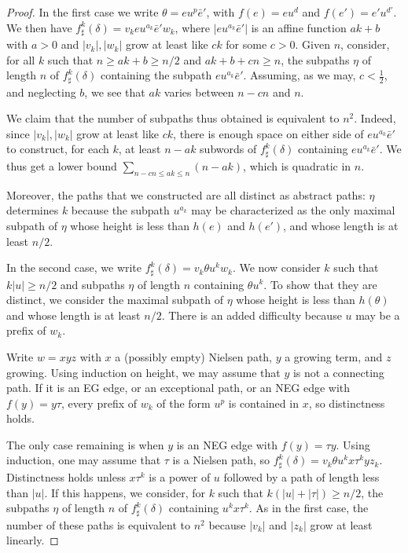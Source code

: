 \documentclass[11pt]{amsart}
\theoremstyle{remark}
\begin{document}
\begin{proof}
In the first case we write  $\theta=eu^p\bar e'$, with $f(e)=eu^d$ and $f(e')=e'u^{d'}$.
We then have  $f^k_\sharp(\delta)=v_keu^{a_k}\bar e'w_k$, where $ | eu^{a_k}\bar e' | $ is an affine function $ak+b$  with $a>0$ and   $ | v_k | , | w_k | $  grow at least like $ck$ for some $c>0$. Given $n$, consider, for all $k$ such that $n\ge ak+b\ge n/2$ and $ ak+b+cn \ge n$, 
the subpaths $\eta$ of length $n$ of $f^k_\sharp(\delta)$ containing the subpath $eu^{a_k}\bar e'$. Assuming, as we may, $c<\frac12$, and neglecting $b$, we see that $ak$ varies between $n-cn$ and $n$.

 We claim that the number of subpaths thus obtained is equivalent to $n^2$.    
 Indeed, since $ | v_k | , | w_k | $ grow at least like $ck$, there is enough space on either side of $eu^{a_k}\bar e'$  to construct, for each $k$, at least $n-ak$ subwords of $f^k_\sharp(\delta)$ containing $eu^{a_k}\bar e'$.  We thus get  a lower bound $\displaystyle\sum_{   {n-cn}\le ak\le{  n}}(n-ak) $, which is quadratic in $n$.




 Moreover,
%
the paths that we constructed are all distinct as abstract paths: $\eta$ determines $k$  because the subpath $u^{a_k}$ may be characterized as the only maximal subpath   of $\eta$ whose height   is less than $h(e)$ and $h(e')$, and whose length is at least $n/2$.   

 In the second case, we write $f^k_\sharp(\delta)=v_k\theta u^{ k} w_k$. We now consider $k$ such that $k | u | \ge n/2$ and subpaths $\eta$ of length $n$ containing $\theta u^k$. To show that they are distinct, we consider the maximal subpath   of $\eta$ whose height   is less than $h(\theta)$ and whose length is at least $n/2$. There is an added difficulty 
 because $u$ may be a prefix of $w_k$. 
 
 Write $w=xyz$ with $x$ a (possibly empty)  
   Nielsen path, $y$ a  growing term, and $z$ growing. Using induction on height, we may assume that $y$ is not a connecting path.  
    If it is an EG edge, or an exceptional path, or an   NEG edge with $f(y)=y\tau$, 
     every prefix of $w_k$ of the form $u^p$ is contained in $x$, 
 so distinctness holds. 
 

 The only case remaining is when $y$ is an NEG edge with $f(y)=\tau y$. Using induction, one may assume that  $\tau$ is a Nielsen path, so $f^k_\sharp(\delta)=v_k\theta u^{ k} x\tau^kyz_k$. Distinctness holds 
 unless $x\tau^k$ is a power of $u$ followed by a path of length less than $ | u | $. If this happens, we consider, for $k$ such that $k (| u |+| \tau | )\ge n/2$, the subpaths $\eta$ of length $n$ of $f^k_\sharp(\delta)$ containing $u^{ k} x\tau^k$. 
  As in the first case,  
 the number of these paths is equivalent to $n^2$ because $| v_k |$ and $|z_k|$   grow at least  linearly.
\end{proof}
\end{document}
